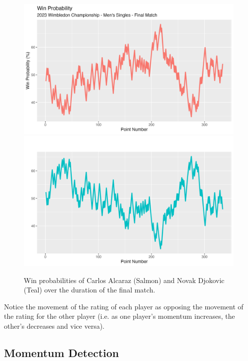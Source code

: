 \documentclass[letterpaper, 12pt]{article}
\begin{document}
            \begin{figure}[H]
                \includegraphics[keepaspectratio, width = \textwidth]{Figures/Carlos_Alcaraz_Final_Match_Win_Probability.png}
                \includegraphics[keepaspectratio, width = \textwidth]{Figures/Novak_Djokovic_Final_Match_Win_Probability.png}
                \caption{Win probabilities of Carlos Alcaraz (Salmon) and Novak Djokovic (Teal) over the duration of the final match.}
                \label{fig:Win_Probabilties}
            \end{figure}

            \noindent
            Notice the movement of the rating of each player as opposing the movement of the rating for the other player (i.e. as one player's momentum increases, the other's decreases and vice versa).

        
        \subsection{Momentum Detection}\label{sec:Momentum_Detection}
\end{document}
